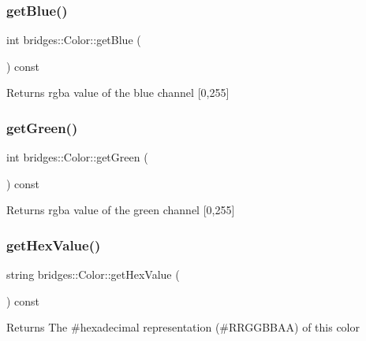 \subsubsection{\texorpdfstring{getBlue()}{getBlue()}}
{\footnotesize\ttfamily int bridges\+::\+Color\+::get\+Blue (\begin{DoxyParamCaption}{ }\end{DoxyParamCaption}) const\hspace{0.3cm}{\ttfamily [inline]}}

\begin{DoxyReturn}{Returns}
rgba value of the blue channel \mbox{[}0,255\mbox{]} 
\end{DoxyReturn}
\mbox{\label{classbridges_1_1_color_a93f8e016e1f1e6c177924ad8712e3e48}} 
\subsubsection{\texorpdfstring{getGreen()}{getGreen()}}
{\footnotesize\ttfamily int bridges\+::\+Color\+::get\+Green (\begin{DoxyParamCaption}{ }\end{DoxyParamCaption}) const\hspace{0.3cm}{\ttfamily [inline]}}

\begin{DoxyReturn}{Returns}
rgba value of the green channel \mbox{[}0,255\mbox{]} 
\end{DoxyReturn}
\mbox{\label{classbridges_1_1_color_a051fa9e828ce7025093c65c46358a8cf}} 
\subsubsection{\texorpdfstring{getHexValue()}{getHexValue()}}
{\footnotesize\ttfamily string bridges\+::\+Color\+::get\+Hex\+Value (\begin{DoxyParamCaption}{ }\end{DoxyParamCaption}) const\hspace{0.3cm}{\ttfamily [inline]}}

\begin{DoxyReturn}{Returns}
The \#hexadecimal representation (\#\+R\+R\+G\+G\+B\+B\+AA) of this color 
\end{DoxyReturn}
\mbox{\label{classbridges_1_1_color_a4c81e33854a6fdba9a3030e97ec8609e}} 

